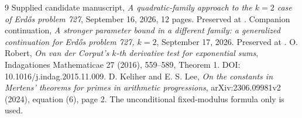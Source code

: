 \documentclass[11pt]{article}
\begin{document}
\begin{thebibliography}{9}
 Supplied candidate manuscript, \emph{A quadratic-family approach
to the $k=2$ case of Erd\H{o}s problem 727}, September 16, 2026, 12 pages.
Preserved at .
 Companion continuation, \emph{A stronger parameter bound in a
different family: a generalized continuation for Erd\H{o}s problem 727, $k=2$},
September 17, 2026. Preserved at
.
 O. Robert, \emph{On van der Corput's $k$-th derivative test for
exponential sums}, Indagationes Mathematicae 27 (2016), 559--589,
Theorem 1. DOI: 10.1016/j.indag.2015.11.009.
 D. Keliher and E. S. Lee, \emph{On the constants in Mertens'
theorems for primes in arithmetic progressions}, arXiv:2306.09981v2 (2024),
equation (6), page 2. The unconditional fixed-modulus formula only is used.
\end{thebibliography}
\end{document}
